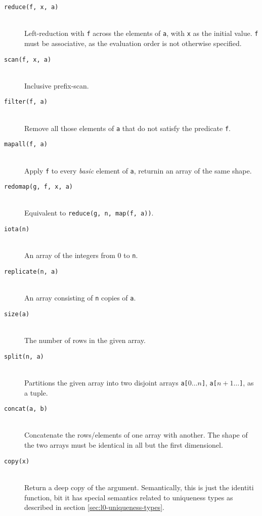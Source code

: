\documentclass[oneside]{memoir}
\begin{document}
\begin{description}
  \item[\texttt{reduce(f, x, a)}]\hfill\\
    Left-reduction with \texttt{f} across the elements of \texttt{a},
    with \texttt{x} as the initial value.  \texttt{f} must be
    associative, as the evaluation order is not otherwise specified.

  \item[\texttt{scan(f, x, a)}]\hfill\\
    Inclusive prefix-scan.

  \item[\texttt{filter(f, a)}]\hfill\\
    Remove all those elements of \texttt{a} that do not satisfy the predicate \texttt{f}.

  \item[\texttt{mapall(f, a)}]\hfill\\
    Apply \texttt{f} to every \emph{basic} element of \texttt{a},
    returnin an array of the same shape.

  \item[\texttt{redomap(g, f, x, a)}]\hfill\\
    Equivalent to \texttt{reduce(g, n, map(f, a))}.

  \item[\texttt{iota(n)}]\hfill\\
    An array of the integers from $0$ to \texttt{n}.

  \item[\texttt{replicate(n, a)}]\hfill\\
    An array consisting of \texttt{n} copies of \texttt{a}.

  \item[\texttt{size(a)}]\hfill\\
    The number of rows in the given array.

  \item[\texttt{split(n, a)}]\hfill\\
    Partitions the given array into two disjoint arrays
    \texttt{a[$0\ldots{}n$]}, \texttt{a[$n+1\ldots{}$]}, as a tuple.

  \item[\texttt{concat(a, b)}]\hfill\\
    Concatenate the rows/elements of one array with another.  The
    shape of the two arrays must be identical in all but the first
    dimensionel.

  \item[\texttt{copy(x)}]\hfill\\
    Return a deep copy of the argument.  Semantically, this is just
    the identiti function, bit it has special semantics related to
    uniqueness types as described in section
    \ref{sec:l0-uniqueness-types}.


\end{description}
\end{document}
